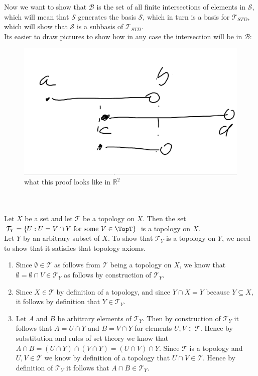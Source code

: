 \documentclass{article}
\newcommand{\R}{\mathbb{R}}
\newcommand{\topT}{\mathcal{T}}
\newcommand{\standtop}{\mathcal{T}_{STD}}
\begin{document}
Now we want to show that $\mathcal{B}$ is the set of all finite intersections of elements in $\mathcal{S}$, which will mean that $\mathcal{S}$ generates the basis $\mathcal{S}$, which in turn is a basis for $\standtop$, which will show that $\mathcal{S}$ is a subbasis of $\standtop$.\\

Its easier to draw pictures to show how in any case the intersection will be in $\mathcal{B}$:
\begin{figure}[htbp]
\centerline{\includegraphics[scale=0.5]{notebook/intervals.png}}
\caption{what this proof looks like in $\R^2$}
\label{fig}
\end{figure}
\\





\\

 Let $X$ be a set and let $\topT$ be a topology on $X$. Then the set $\topT_Y = \{U : U = V\cap Y \mbox{ for some } V\in \TopT \}$ is a topology on $X$.\\

 Let $Y$ by an arbitrary subset of $X$. To show that $\topT_Y$ is a topology on $Y$, we need to show that it satisfies that topology axioms.
\begin{enumerate}
\item Since $\emptyset\in \topT$ as follows from $\topT$ being a topology on $X$, we know that $\emptyset = \emptyset \cap V \in \topT_Y$ as follows by construction of $\topT_Y$.
\item Since $X\in \topT$ by definition of a topology, and since $Y\cap X = Y$ because $Y\subseteq X$, it follows by definition that $Y \in \topT_Y$.
\item Let $A$ and $B$ be arbitrary elements of $\topT_Y$. Then by construction of $\topT_Y$ it follows that $A = U\cap Y$ and $B = V\cap Y$ for elements $U,V\in \topT$. Hence by substitution and rules of set theory we know that $A\cap B = (U\cap Y)\cap (V\cap Y) = (U\cap V)\cap Y$. Since $\topT$ is a topology and $U,V\in \topT$ we know by definition of a topology that $U\cap V\in \topT$. Hence by definition of $\topT_Y$ it follows that $A\cap B\in \topT_Y$.
\end{enumerate}
\end{document}
